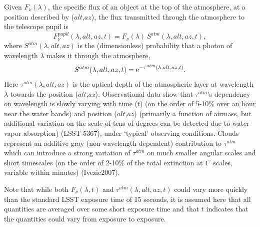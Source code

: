 \documentclass[12pt,preprint]{aastex}
\begin{document}
Given $F_\nu(\lambda)$, the specific flux of an object at
the top of the atmosphere, at a position described by ($alt$,$az$),
the flux transmitted through the atmosphere to the telescope pupil is
\begin{equation}
\label{eqn:Fpupil}
   F_\nu^{pupil}(\lambda,alt,az,t) = F_\nu(\lambda) \, S^{atm}(\lambda,alt,az,t),
\end{equation}
where $S^{atm}(\lambda,alt,az)$ is the (dimensionless) probability that a photon of 
wavelength $\lambda$ makes it through the atmosphere,
\begin{equation}
\label{eqn:atmTau}
   S^{atm}(\lambda,alt,az,t)   = {\rm e}^{-\tau^{atm}(\lambda,alt,az,t)}.
\end{equation}
Here $\tau^{atm}(\lambda,alt,az)$ is the optical depth of the
atmospheric layer at wavelength $\lambda$ towards the position
($alt$,$az$).  Observational data show that $\tau^{atm}$'s dependency
on wavelength is slowly varying with time ($t$) (on the order of
5-10\% over an hour near the water bands) and position ($alt$,$az$)
(primarily a function of airmass, but additional variation on the
scale of tens of degrees can be detected due to water vapor
absorption) (LSST-5367), under `typical' observing conditions.  
Clouds represent an additive gray (non-wavelength dependent)
contribution to $\tau^{atm}$ which can introduce a strong variation of
$\tau^{atm}$ on much smaller angular scales and short timescales (on
the order of 2-10\% of the total extinction at $1^{\circ}$ scales,
variable within minutes) (Ivezic2007). 

Note that while both $F_\nu(\lambda,t)$ and $\tau^{atm}(\lambda,alt,az,t)$ 
could vary more quickly than the standard LSST exposure time of 15
seconds, it is assumed here that all quantities are averaged over some
short exposure time and that $t$ indicates that the quantities could
vary from exposure to exposure. 
\end{document}
